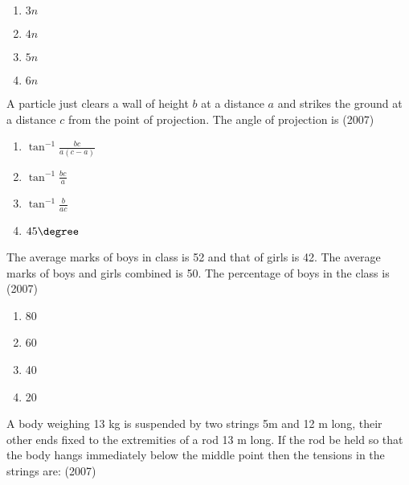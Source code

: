         \begin{multicols}{4}
            \begin{enumerate}
                \item $3n$
                \item $4n$ 
                \item $5n$
                \item $6n$ 
            \end{enumerate} 
        \end{multicols}

    \item A particle just clears a wall of height $b$ at a distance
        $a$ and strikes the ground at a distance $c$ from the point
        of projection. The angle of projection is
        \hfill (2007)

        \begin{multicols}{4}
            \begin{enumerate}
                \item $\tan^{-1} \frac {bc} {a(c - a)}$
                \item $\tan^{-1} \frac {bc} {a}$
                \item $\tan^{-1} \frac {b} {ac}$
                \item $45 \degree$
            \end{enumerate} 
        \end{multicols}

    \item The average marks of boys in class is 52 and that of girls
        is 42. The average marks of boys and girls combined is 50.
        The percentage of boys in the class is
        \hfill (2007)

        \begin{multicols}{4}
            \begin{enumerate}
                \item 80
                \item 60
                \item 40
                \item 20
            \end{enumerate} 
        \end{multicols}

    \item A body weighing 13 kg is suspended by two strings 5m and
        12 m long, their other ends fixed to the extremities of a
        rod 13 m long. If the rod be held so that the body hangs
        immediately below the middle point then the tensions in the
        strings are:
        \hfill (2007)

